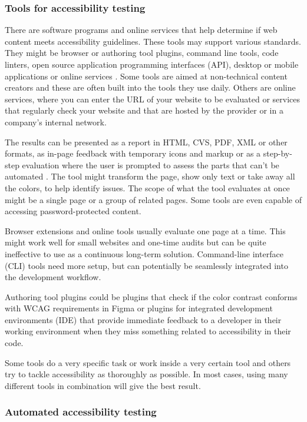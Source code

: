 \documentclass{master_thesis}
\begin{document}
\subsubsection{Tools for accessibility testing}

There are software programs and online services that help determine if web content meets accessibility guidelines. These tools may support various standards. They might be browser or authoring tool plugins, command line tools, code linters, open source application programming interfaces (API), desktop or mobile applications or online services \citep{AbouZahra2017}. Some tools are aimed at non-technical content creators and these are often built into the tools they use daily. Others are online services, where you can enter the URL of your website to be evaluated or services that regularly check your website and that are hosted by the provider or in a company's internal network.

The results can be presented as a report in HTML, CVS, PDF, XML or other formats, as in-page feedback with temporary icons and markup or as a step-by-step evaluation where the user is prompted to assess the parts that can't be automated \citep{AbouZahra2017}. The tool might transform the page, show only text or take away all the colors, to help identify issues. The scope of what the tool evaluates at once might be a single page or a group of related pages. Some tools are even capable of accessing password-protected content.

Browser extensions and online tools usually evaluate one page at a time. This might work well for small websites and one-time audits but can be quite ineffective to use as a continuous long-term solution. Command-line interface (CLI) tools need more setup, but can potentially be seamlessly integrated into the development workflow.

Authoring tool plugins could be plugins that check if the color contrast conforms with WCAG requirements in Figma or plugins for integrated development environments (IDE) that provide immediate feedback to a developer in their working environment when they miss something related to accessibility in their code.

Some tools do a very specific task or work inside a very certain tool and others try to tackle accessibility as thoroughly as possible. In most cases, using many different tools in combination will give the best result.

\subsubsection{Automated accessibility testing}
\end{document}
